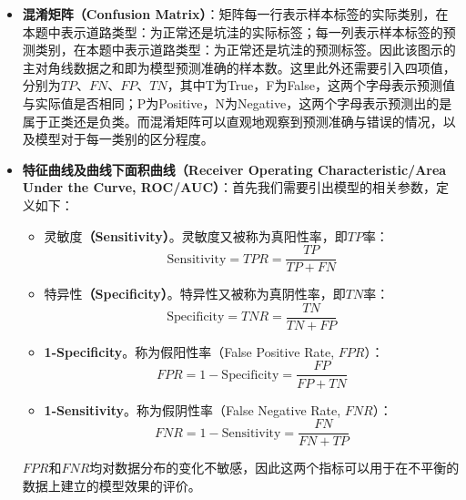 \documentclass{MathorCupmodeling}
\begin{document}
\begin{itemize}
		\item \textbf{混淆矩阵（Confusion Matrix）}：矩阵每一行表示样本标签的实际类别，在本题中表示道路类型：为正常还是坑洼的实际标签；每一列表示样本标签的预测类别，在本题中表示道路类型：为正常还是坑洼的预测标签。因此该图示的主对角线数据之和即为模型预测准确的样本数。这里此外还需要引入四项值，分别为$TP$、$FN$、$FP$、$TN$，其中T为True，F为False，这两个字母表示预测值与实际值是否相同；P为Positive，N为Negative，这两个字母表示预测出的是属于正类还是负类。而混淆矩阵可以直观地观察到预测准确与错误的情况，以及模型对于每一类别的区分程度。
		\item \textbf{特征曲线及曲线下面积曲线（Receiver Operating Characteristic/Area Under the Curve, ROC/AUC）}：首先我们需要引出模型的相关参数，定义如下：
		\begin{itemize}
			\item {\heiti 灵敏度}\textbf{（Sensitivity）}。灵敏度又被称为真阳性率，即$TP$率：
			\begin{equation}
				\mathrm{Sensitivity}=TPR=\frac{TP}{TP+FN} \label{Sensitivity}
			\end{equation}
			\item {\heiti 特异性}\textbf{（Specificity）}。特异性又被称为真阴性率，即$TN$率：
			\begin{equation}
				\mathrm{Specificity}=TNR=\frac{TN}{TN+FP} \label{Specificity}
			\end{equation}
			\item \textbf{1-Specificity}。称为假阳性率（False Positive Rate, $FPR$）：
			\begin{equation}
				FPR=1-\mathrm{Specificity}=\frac{FP}{FP+TN} \label{FPR}
			\end{equation}
			\item \textbf{1-Sensitivity}。称为假阴性率（False Negative Rate, $FNR$）：
			\begin{equation}
				FNR=1-\mathrm{Sensitivity}=\frac{FN}{FN+TP} \label{FNR}
			\end{equation}
		\end{itemize}
		$FPR$和$FNR$均对数据分布的变化不敏感\textcolor{blue}{\cite{Tharwat}}，因此这两个指标可以用于在不平衡的数据上建立的模型效果的评价。
		

\end{itemize}
\end{document}
